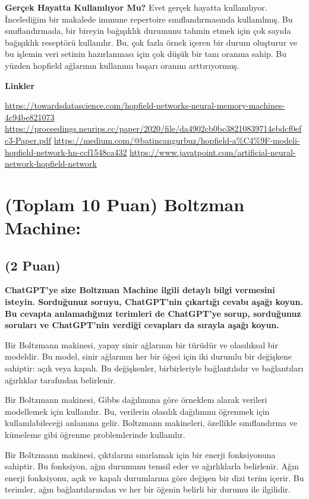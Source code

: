 \documentclass[11pt]{article}
\begin{document}
\textbf{Gerçek Hayatta Kullanılıyor Mu?}
Evet gerçek hayatta kullanılıyor. İncelediğim bir makalede immune repertoire sınıflandırmasında kullanılmış. Bu sınıflandırmada, bir bireyin bağışıklık durumunu tahmin etmek için çok sayıda bağışıklık reseptörü kullanılır. Bu, çok fazla örnek içeren bir durum oluşturur ve bu işlemin veri setinin hazırlanması için çok düşük bir tanı oranına sahip. Bu yüzden hopfield ağlarının kullanımı başarı oranını arttırıyormuş.

\textbf{Linkler}

\url{https://towardsdatascience.com/hopfield-networks-neural-memory-machines-4c94be821073}
\url{https://proceedings.neurips.cc/paper/2020/file/da4902cb0bc38210839714ebdcf0efc3-Paper.pdf}
\url{https://medium.com/@batincangurbuz/hopfield-a%C4%9F-modeli-hopfield-network-hn-ccf1548ca432}
\url{https://www.javatpoint.com/artificial-neural-network-hopfield-network}


\section{(Toplam 10 Puan) Boltzman Machine:}

\subsection{(2 Puan)} \textbf{ChatGPT’ye size Boltzman Machine ilgili detaylı bilgi vermesini isteyin. Sorduğunuz soruyu, ChatGPT'nin çıkartığı cevabı aşağı koyun. Bu cevapta anlamadığınız terimleri de ChatGPT’ye sorup, sorduğunuz soruları ve ChatGPT’nin verdiği cevapları da sırayla aşağı koyun.}

Bir Boltzmann makinesi, yapay sinir ağlarının bir türüdür ve olasılıksal bir modeldir. Bu model, sinir ağlarının her bir öğesi için iki durumlu bir değişkene sahiptir: açık veya kapalı. Bu değişkenler, birbirleriyle bağlantılıdır ve bağlantıları ağırlıklar tarafından belirlenir.

Bir Boltzmann makinesi, Gibbs dağılımına göre örneklem alarak verileri modellemek için kullanılır. Bu, verilerin olasılık dağılımını öğrenmek için kullanılabileceği anlamına gelir. Boltzmann makineleri, özellikle sınıflandırma ve kümeleme gibi öğrenme problemlerinde kullanılır.

Bir Boltzmann makinesi, çıktılarını sınırlamak için bir enerji fonksiyonuna sahiptir. Bu fonksiyon, ağın durumunu temsil eder ve ağırlıklarla belirlenir. Ağın enerji fonksiyonu, açık ve kapalı durumlarına göre değişen bir dizi terim içerir. Bu terimler, ağın bağlantılarından ve her bir öğenin belirli bir durumu ile ilgilidir.
\end{document}
